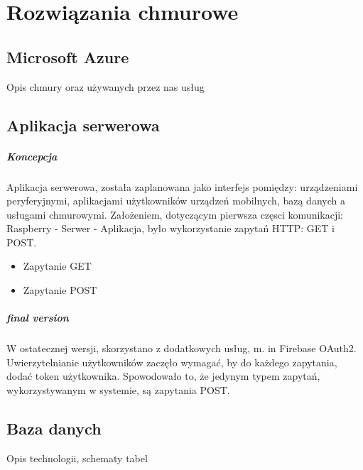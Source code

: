 \chapter{Rozwiązania chmurowe}

\section*{Microsoft Azure}

Opis chmury oraz używanych przez nas usług

\section*{Aplikacja serwerowa}

\paragraph{Koncepcja}
Aplikacja serwerowa, została zaplanowana jako interfejs pomiędzy: urządzeniami peryferyjnymi, aplikacjami użytkowników urządzeń mobilnych, bazą danych a usługami chmurowymi.
Założeniem, dotyczącym pierwsza częsci komunikacji: Raspberry - Serwer - Aplikacja, było wykorzystanie zapytań HTTP: GET i POST.
\begin{itemize}
\item Zapytanie GET 
\item Zapytanie POST
\end{itemize}

\paragraph{final version}
W ostatecznej wersji, skorzystano z dodatkowych usług, m. in Firebase OAuth2. Uwierzytelnianie użytkowników zaczęło wymagać, by do każdego zapytania, dodać token użytkownika. Spowodowało to, że jedynym typem zapytań, wykorzystywanym w systemie, są zapytania POST. 

\section*{Baza danych}

Opis technologii, schematy tabel
